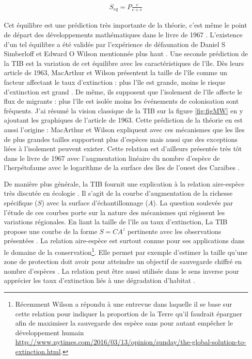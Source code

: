 \begin{eqnarray}
S_{eq} = P \frac{c}{c+e}
\end{eqnarray}

Cet équilibre est une prédiction très importante de la théorie, c'est
même le point de départ des développements mathématiques dans le livre
de 1967 \citep{MacArthur1967}. L'existence d'un tel équilibre a été
validée par l'expérience de défaunation de Daniel S Simberloff et Edward
O Wilson mentionnée plus haut \citep{Simberloff1969}. Une seconde
prédiction de la TIB est la variation de cet équilibre avec les
caractéristiques de l'île. Dès leurs article de 1963, MacArthur et
Wilson présentent la taille de l'île comme un facteur affectant le taux
d'extinction : plus l'île est grande, moins le risque d'extinction est
grand \citep{MacArthur1963}. De même, ils supposent que l'isolement de
l'île affecte le flux de migrants : plus l'île est isolée moins les
événements de colonisation sont fréquents. J'ai résumé la vision
classique de la TIB sur la figure \ref{fig:figMW} en y ajoutant les
graphiques de l'article de 1963. Cette prédiction de la théorie en est
aussi l'origine : MacArthur et Wilson expliquent avec ces mécanismes que
les îles de plus grandes tailles supportent plus d'espèces mais aussi
que des exceptions liées à l'isolement peuvent exister. Cette relation
est d'ailleurs présentée très tôt dans le livre de 1967 avec
l'augmentation linéaire du nombre d'espèce de l'herpétofaune avec le
logarithme de la surface des îles de l'ouest des Caraïbes
\citep[chapitre 2]{MacArthur1967}.

De manière plus générale, la TIB fournit une explication à la relation
aire-espèce très discutée en écologie \citep{Lomolino2000a}. Il s'agit
de la courbe d'augmentation de la richesse spécifique (\(S\)) avec la
surface d'échantillonnage (\(A\)). La question soulevée par l'étude de
ces courbes porte sur la nature des mécanismes qui régissent les
variations régionales. En liant la taille de l'île au taux d'extinction,
La TIB propose une courbe de la forme \(S=CA^z\) pertinente avec les
observations présentées \citep{MacArthur1967}. La relation aire-espèce
est surtout connue pour ses applications dans le domaine de la
conservation\footnote{Récemment Wilson a répondu à une entrevue dans
  laquelle il se base sur cette relation pour indiquer la proportion de
  la Terre qu'il faudrait épargner afin de maximiser la sauvegarde des
  espèce sans pour autant empêcher le développement humain
  \url{http://www.nytimes.com/2016/03/13/opinion/sunday/the-global-solution-to-extinction.html}.}.
Elle permet par exemple d'estimer la taille qu'une zone de protection
doit avoir pour atteindre un objectif de sauvegarde chiffré en nombre
d'espèces \citep{Neigel2003, Desmet2004}. La relation peut être aussi
utilisée dans le sens inverse pour apprécier les taux d'extinction liés
à une dégradation d'habitat \citep{He2011}.

